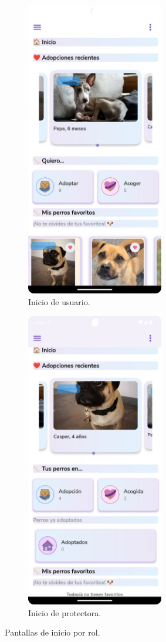 \documentclass[a4paper, 12pt]{article}
\begin{document}
\begin{figure}[H]
   	\begin{subfigure}{0.48\textwidth}
		\begin{center}
			{\includegraphics[width=6cm]{app/UserHome.png}\par}
			\caption{Inicio de usuario.}
		\end{center}  
	\end{subfigure}\hfill
   	\begin{subfigure}{0.48\textwidth}
		\begin{center}
			{\includegraphics[width=6cm]{app/CompanyHome.png}\par}
			\caption{Inicio de protectora.}
		\end{center}  
	\end{subfigure}\hfill
	\caption{Pantallas de inicio por rol.}
\end{figure}
\end{document}
